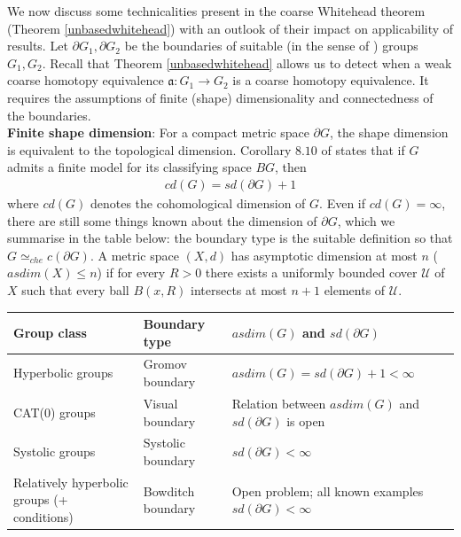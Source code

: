 \documentclass[a4paper,11pt]{article}
\theoremstyle{definition}
\theoremstyle{plain}
\theoremstyle{remark}
\begin{document}
We now discuss some technicalities present in the coarse Whitehead theorem (Theorem \ref{unbasedwhitehead}) with an outlook of their impact on applicability of results. Let $\partial G_1,\partial G_2$ be the boundaries of suitable (in the sense of \cite{Fukaya_2018}) groups $G_1,G_2$.  Recall that Theorem \ref{unbasedwhitehead} allows us to detect when a weak coarse homotopy equivalence $\mathfrak{a}:G_1\rightarrow G_2$ is a coarse homotopy equivalence. It requires the assumptions of finite (shape) dimensionality and connectedness of the boundaries.\\

\textbf{Finite shape dimension}: For a compact metric space $\partial G$, the shape dimension is equivalent to the topological dimension. Corollary $8.10$ of \cite{Fukaya_2018} states that if $G$ admits a finite model for its classifying space $BG$, then 
\begin{align*}
cd(G) = sd (\partial G)+1
\end{align*}
where $cd(G)$ denotes the cohomological dimension of $G$. Even if $cd(G) = \infty$, there are still some things known about the dimension of $\partial G$, which we summarise in the table below: the boundary type is the suitable definition so that $G\simeq_{che} c(\partial G)$. A metric space $(X,d)$ has asymptotic dimension at most $n$ ($asdim(X)\leq n$) if for every $R>0$ there exists a uniformly bounded cover $\mathcal U$ of $X$ such that every ball $B(x,R)$ intersects at most $n+1$ elements of $\mathcal U$.

\begin{center}
\begin{tabular}{|p{3.5cm}|p{3.5cm}|p{6.5cm}|}

\hline

\textbf{Group class} 
& \textbf{Boundary type} 
& \textbf{$asdim(G)$ and $sd(\partial G)$} \\
\hline

Hyperbolic groups 
& Gromov boundary  
& $asdim(G) = sd(\partial G) + 1<\infty$ \cite{BuyaloLebedeva2007} \\
\hline

CAT(0) groups 
& Visual boundary  
& Relation between $asdim(G)$ and $sd(\partial G)$ is open \\
\hline

Systolic groups 
& Systolic boundary 
& $sd(\partial G)< \infty$ \cite{Osajda2009} \\
\hline

Relatively hyperbolic groups (+ conditions)
& Bowditch boundary 
& Open problem; all known examples $sd(\partial G)< \infty$ \\
\hline
\end{tabular}
\end{center}
\end{document}
